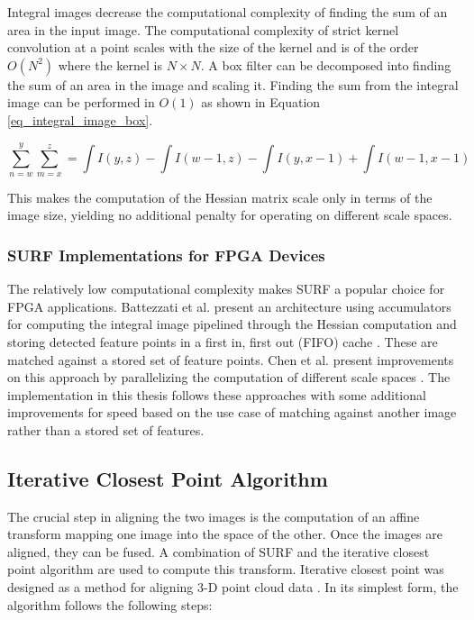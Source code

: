 \documentclass[sigconf]{acmart}
\begin{document}
Integral images decrease the computational complexity of finding the sum of an area in the input image. The computational complexity of strict kernel convolution at a point scales with the size of the kernel and is of the order $O(N^2)$ where the kernel is $N \times N$. A box filter can be decomposed into finding the sum of an area in the image and scaling it. Finding the sum from the integral image can be performed in $O(1)$ as shown in Equation \ref{eq_integral_image_box}. 

\begin{equation}
\sum\limits_{n=w}^y \sum\limits_{m=x}^z = \int I(y,z) - \int I(w-1,z) - \int I(y,x-1) + \int I(w-1, x-1)
\label{eq_integral_image_box}
\end{equation}

This makes the computation of the Hessian matrix scale only in terms of the image size, yielding no additional penalty for operating on different scale spaces.

\subsubsection{SURF Implementations for FPGA Devices}

The relatively low computational complexity makes SURF a popular choice for FPGA applications. Battezzati et al. present an architecture using accumulators for computing the integral image pipelined through the Hessian computation and storing detected feature points in a first in, first out (FIFO) cache \cite{battezzati_surf_2012}. These are matched against a stored set of feature points. Chen et al. present improvements on this approach by parallelizing the computation of different scale spaces \cite{chen_fpga-based_2016}. The implementation in this thesis follows these approaches with some additional improvements for speed based on the use case of matching against another image rather than a stored set of features.

\subsection{Iterative Closest Point Algorithm}

The crucial step in aligning the two images is the computation of an affine transform mapping one image into the space of the other. Once the images are aligned, they can be fused. A combination of SURF and the iterative closest point algorithm are used to compute this transform. Iterative closest point was designed as a method for aligning 3-D point cloud data \cite{chen_object_1992}. In its simplest form, the algorithm follows the following steps:
\end{document}
